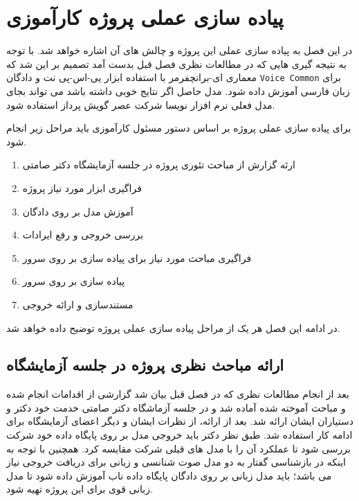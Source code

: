 \chapter{پیاده سازی عملی پروژه کارآموزی}
در این فصل به پیاده سازی عملی این پروژه و چالش های آن اشاره خواهد شد. با توجه به نتیجه گیری هایی که در مطالعات نظری فصل قبل بدست آمد تصمیم بر این شد که معماری ای-برانچفرمر
با استفاده ابزار 
یی-اس-پی نت
و دادگان 
\verb|Voice Common|
برای زبان فارسی آموزش داده شود. مدل حاصل اگر نتایج خوبی داشته باشد می تواند بجای مدل فعلی نرم افزار نویسا شرکت عصر گویش پرداز استفاده شود.


برای پیاده سازی عملی پروژه بر اساس دستور مسئول کارآموزی باید مراحل زیر انجام شود.
\begin{enumerate}

  \item ارئه گزارش از مباحث تئوری پروژه در جلسه آزمایشگاه دکتر صامتی

  \item فراگیری ابزار مورد نیاز پروژه

  \item آموزش مدل بر روی دادگان

  \item بررسی خروجی و رفع ایرادات

  \item فراگیری مباحث مورد نیاز برای پیاده سازی بر روی سرور

  \item پیاده سازی بر روی سرور

  \item مستندسازی و ارائه خروجی
  

\end{enumerate}

در ادامه این فصل هر یک از مراحل پیاده سازی عملی پروژه توضیح داده خواهد شد.

\section{ارائه مباحث نظری پروژه در جلسه آزمایشگاه}

بعد از انجام مطالعات نظری که در فصل قبل بیان شد گزارشی از اقدامات انجام شده و مباحث آموخته شده آماده شد و در جلسه آزماشگاه دکتر صامتی خدمت خود دکتر و دستیاران ایشان ارائه شد. بعد از ارائه، از نظرات ایشان و دیگر اعضای آزمایشگاه برای ادامه کار استفاده شد.
طبق نظر دکتر باید خروجی مدل بر روی پایگاه داده خود شرکت بررسی شود تا عملکرد آن را با مدل های قبلی شرکت مقایسه کرد.
همچنین با توجه به اینکه در بازشناسی گفتار به دو مدل صوت شنانسی و زبانی برای دریافت خروجی نیاز می باشد؛ باید مدل زبانی بر روی دادگان پایگاه داده ناب آموزش داده شود تا مدل زبانی قوی برای این پروژه تهیه شود.


